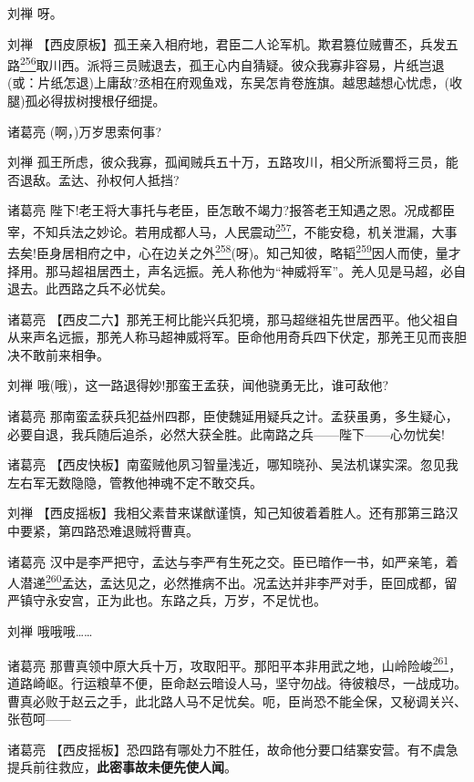 刘禅 呀。

刘禅
【西皮原板】孤王亲入相府地，君臣二人论军机。欺君篡位贼曹丕，兵发五路\protect\hyperlink{fn256}{\textsuperscript{256}}取川西。派将三员贼退去，孤王心内自猜疑。彼众我寡非容易，片纸岂退(或：片纸怎退)上庸敌?丞相在府观鱼戏，东吴怎肯卷旌旗。越思越想心忧虑，(收腿)孤必得拔树搜根仔细提。

诸葛亮 (啊，)万岁思索何事?

刘禅
孤王所虑，彼众我寡，孤闻贼兵五十万，五路攻川，相父所派蜀将三员，能否退敌。孟达、孙权何人抵挡?

诸葛亮
陛下!老王将大事托与老臣，臣怎敢不竭力?报答老王知遇之恩。况成都臣宰，不知兵法之妙论。若用成都人马，人民震动\protect\hyperlink{fn257}{\textsuperscript{257}}，不能安稳，机关泄漏，大事去矣!臣身居相府之中，心在边关之外\protect\hyperlink{fn258}{\textsuperscript{258}}(呀)。知己知彼，略韬\protect\hyperlink{fn259}{\textsuperscript{259}}因人而使，量才择用。那马超祖居西土，声名远振。羌人称他为``神威将军''。羌人见是马超，必自退去。此西路之兵不必忧矣。

诸葛亮
【西皮二六】那羌王柯比能兴兵犯境，那马超继祖先世居西平。他父祖自从来声名远振，那羌人称马超神威将军。臣命他用奇兵四下伏定，那羌王见而丧胆决不敢前来相争。

刘禅 哦(哦)，这一路退得妙!那蛮王孟获，闻他骁勇无比，谁可敌他?

诸葛亮
那南蛮孟获兵犯益州四郡，臣使魏延用疑兵之计。孟获虽勇，多生疑心，必要自退，我兵随后追杀，必然大获全胜。此南路之兵------陛下------心勿忧矣!

诸葛亮
【西皮快板】南蛮贼他夙习智量浅近，哪知晓孙、吴法机谋实深。忽见我左右军无数隐隐，管教他神魂不定不敢交兵。

刘禅
【西皮摇板】我相父素昔来谋猷谨慎，知己知彼着着胜人。还有那第三路汉中要紧，第四路恐难退贼将曹真。

诸葛亮
汉中是李严把守，孟达与李严有生死之交。臣已暗作一书，如严亲笔，着人潜递\protect\hyperlink{fn260}{\textsuperscript{260}}孟达，孟达见之，必然推病不出。况孟达并非李严对手，臣回成都，留严镇守永安宫，正为此也。东路之兵，万岁，不足忧也。

刘禅 哦哦哦\ldots{}\ldots{}

诸葛亮
那曹真领中原大兵十万，攻取阳平。那阳平本非用武之地，山岭险峻\protect\hyperlink{fn261}{\textsuperscript{261}}，道路崎岖。行运粮草不便，臣命赵云暗设人马，坚守勿战。待彼粮尽，一战成功。曹真必败于赵云之手，此北路人马不足忧矣。呃，臣尚恐不能全保，又秘调关兴、张苞呵------

诸葛亮
【西皮摇板】恐四路有哪处力不胜任，故命他分要口结寨安营。有不虞急提兵前往救应，\textbf{此密事故未便先使人闻}。

